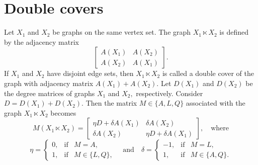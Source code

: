 \documentclass[12pt,a4paper]{article}
\begin{document}
\section{Double covers}\label{5sec3}
Let $X_1$ and $X_2$ be graphs on the same vertex set. The graph $X_1\ltimes X_2$ is defined by the adjacency matrix \[\begin{bmatrix}
    A(X_1) & A(X_2)\\
    A(X_2) & A(X_1)
\end{bmatrix}.\] 
If $X_1$ and $X_2$ have disjoint edge sets, then $X_1\ltimes X_2$ is called a double cover of the graph with adjacency matrix $A(X_1)+A(X_2).$ 
Let $D(X_1)$ and $D(X_2)$ be the degree matrices of graphs $X_1$ and $X_2,$ respectively. Consider $D=D(X_1)+D(X_2).$ Then the matrix $M\in\{A,L,Q\}$ associated with the graph $X_1\ltimes X_2$ becomes
\[M(X_1\ltimes X_2)=\begin{bmatrix}
    \eta D+\delta A(X_1) & \delta A(X_2)\\
   \delta A(X_2) & \eta D+\delta A(X_1)
\end{bmatrix},\quad \text{where}\]
 \[\eta=\left\{ \begin{array}{rcl}
 0, & \mbox{if} & M=A, \\ 
 1, & \mbox{if} & M\in\{L,Q\},
 \end{array}\right.\quad 
\text{and} \quad \delta=\left\{ \begin{array}{rcl}
 -1, & \mbox{if} & M =L, \\ 
 1, & \mbox{if} & M \in\{A,Q\}. 
 \end{array}\right.\] 
\end{document}
